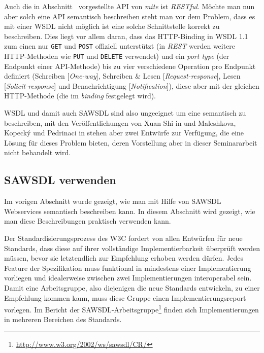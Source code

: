 Auch die in Abschnitt~\pageref{l:einleitung} vorgestellte \ac{API} von \emph{mite} ist \emph{RESTful}. Möchte man nun aber solch eine \ac{API} semantisch beschreiben steht man vor dem Problem, dass es mit einer \ac{WSDL} nicht möglich ist eine solche Schnittstelle korrekt zu beschreiben. Dies liegt vor allem daran, dass das HTTP-Binding in \ac{WSDL} 1.1 zum einen nur \texttt{GET} und \texttt{POST} offiziell unterstützt (in \emph{REST} werden weitere HTTP-Methoden wie \texttt{PUT} und \texttt{DELETE} verwendet) und ein \emph{port type} (der Endpunkt einer API-Methode) bis zu vier verschiedene Operation pro Endpunkt definiert (Schreiben [\emph{One-way}], Schreiben \& Lesen [\emph{Request-response}], Lesen [\emph{Solicit-response}] und Benachrichtigung [\emph{Notification}]), diese aber mit der gleichen HTTP-Methode (die im \emph{binding} festgelegt wird).

\ac{WSDL} und damit auch \ac{SAWSDL} sind also ungeeignet um eine \restapi semantisch zu beschreiben, mit den Veröffentlichungen von Xuan Shi in \cite{xn-sss} und Maleshkova, Kopeck\'{y} und Pedrinaci in \cite{ma-sawslrest} stehen aber zwei Entwürfe zur Verfügung, die eine Lösung für dieses Problem bieten, deren Vorstellung aber in dieser Seminararbeit nicht behandelt wird.

\subsection{\acs{SAWSDL} verwenden}

Im vorigen Abschnitt wurde gezeigt, wie man mit Hilfe von \ac{SAWSDL} Webservices semantisch beschreiben kann. In diesem Abschnitt wird gezeigt, wie man diese Beschreibungen praktisch verwenden kann.

Der Standardisierungsprozess des \ac{W3C} fordert von allen Entwürfen für neue Standards, dass diese auf ihrer vollständige Implementierbarkeit überprüft werden müssen, bevor sie letztendlich zur Empfehlung erhoben werden dürfen. Jedes Feature der Spezifikation muss funktional in mindestens einer Implementierung vorliegen und idealerweise zwischen zwei Implementierungen interoperabel sein. Damit eine Arbeitsgruppe, also diejenigen die neue Standards entwickeln, zu einer Empfehlung kommen kann, muss diese Gruppe einen Implementierungsreport vorlegen. Im Bericht der \ac{SAWSDL}-Arbeitsgruppe\footnote{\url{http://www.w3.org/2002/ws/sawsdl/CR/}} finden sich Implementierungen in mehreren Bereichen des Standards.

